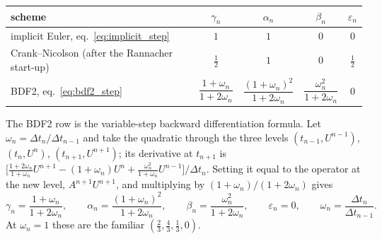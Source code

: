 \documentclass[11pt]{article}
\newcommand{\1}{\mathbf{1}}
\begin{document}
\begin{center}
\begin{tabular}{lcccc}
\toprule
scheme & $\gamma_n$ & $\alpha_n$ & $\beta_n$ & $\varepsilon_n$\\
\midrule
implicit Euler, eq.~\eqref{eq:implicit_step} & $1$ & $1$ & $0$ & $0$\\[1mm]
Crank--Nicolson (after the Rannacher start-up) & $\tfrac12$ & $1$ & $0$ & $\tfrac12$\\[1mm]
BDF2, eq.~\eqref{eq:bdf2_step} &
  $\dfrac{1+\omega_n}{1+2\omega_n}$ &
  $\dfrac{(1+\omega_n)^2}{1+2\omega_n}$ &
  $\dfrac{\omega_n^2}{1+2\omega_n}$ & $0$\\[3mm]
\bottomrule
\end{tabular}
\end{center}

The BDF2 row is the variable-step backward differentiation formula. Let
$\omega_n=\Delta t_n/\Delta t_{n-1}$ and take the quadratic through the three levels
$(t_{n-1},U^{n-1})$, $(t_n,U^n)$, $(t_{n+1},U^{n+1})$; its derivative at $t_{n+1}$ is
$\bigl[\tfrac{1+2\omega_n}{1+\omega_n}U^{n+1}-(1+\omega_n)U^n
+\tfrac{\omega_n^2}{1+\omega_n}U^{n-1}\bigr]/\Delta t_n$.
Setting it equal to the operator at the new level, $A^{n+1}U^{n+1}$, and multiplying by
$(1+\omega_n)/(1+2\omega_n)$ gives
\begin{equation}
  \gamma_n=\frac{1+\omega_n}{1+2\omega_n},\qquad
  \alpha_n=\frac{(1+\omega_n)^2}{1+2\omega_n},\qquad
  \beta_n=\frac{\omega_n^2}{1+2\omega_n},\qquad
  \varepsilon_n=0,
  \qquad
  \omega_n=\frac{\Delta t_n}{\Delta t_{n-1}}.
  \label{eq:bdf2_step}
\end{equation}
At $\omega_n=1$ these are the familiar $(\tfrac23,\tfrac43,\tfrac13,0)$.
\end{document}
